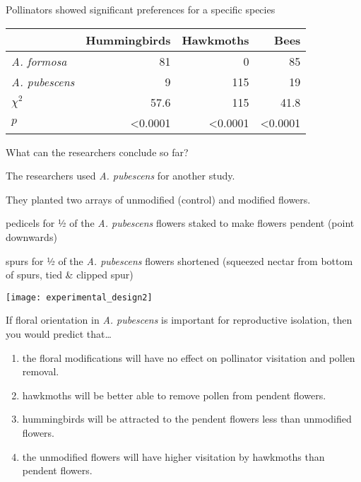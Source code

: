 \documentclass[t,hidelinks]{beamer}
\newcommand{\ques}[1]{\highlight{\textsc{q#1:}}}
\begin{document}
%
\begin{frame}[t]{Pollinators showed significant preferences for a specific species}
		
	\begin{center}
	\begin{tabular}{lrrr}
	\toprule
		 	& Hummingbirds & Hawkmoths & Bees \tabularnewline
	\midrule
	\textit{A. formosa}		&	81	&	0	&	85 \tabularnewline
	\textit{A. pubescens}	&	9	&	115	&	19 \tabularnewline
	$\chi^2$				&	57.6	&	115	&	41.8 \tabularnewline
	$p$						&  \textless0.0001 & \textless0.0001 & \textless0.0001 \tabularnewline
	\bottomrule
	\end{tabular}
	\end{center}

	\hangpara What can the researchers conclude so far?
\end{frame}
%
\begin{frame}[t]{The researchers used \textit{A. pubescens} for another study.}
	
	\vspace*{-\baselineskip}
	
	\hangpara They planted two arrays of unmodified (control) and modified flowers.

	\hangpara {} pedicels for ½ of the \textit{A. pubescens} flowers staked to make flowers pendent (point downwards)
	
	\hangpara {} spurs for ½ of the \textit{A. pubescens} flowers shortened (squeezed nectar from bottom of spurs, tied \& clipped spur)
	
	\centering
	\texttt{[image: experimental\_design2]}

\end{frame}
%
\begin{frame}[t]{\ques9 If floral orientation in \textit{A. pubescens} is important for reproductive isolation, then you would predict that\dots}
	
	
	\begin{enumerate}
		\item the floral modifications will have no effect on pollinator visitation and pollen removal.
		\item hawkmoths will be better able to remove pollen from pendent flowers.
		\item hummingbirds will be attracted to the pendent flowers less than unmodified flowers.
		\item \alert<2>{the unmodified flowers will have higher visitation by hawkmoths than pendent flowers.}
	\end{enumerate}
\end{frame}
\end{document}
